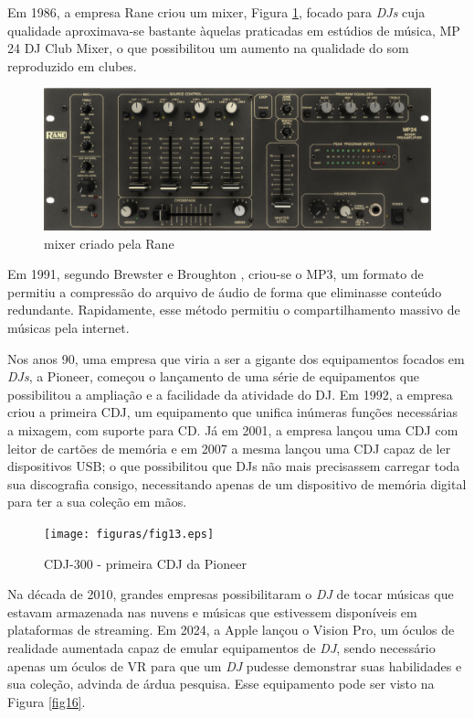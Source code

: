Em 1986, a empresa Rane criou um mixer, Figura \ref{fig15}, focado para \textit{DJs} cuja qualidade aproximava-se bastante àquelas praticadas em estúdios de música, MP 24 DJ Club Mixer, o que possibilitou um aumento na qualidade do som reproduzido em clubes.
\begin{figure}[h]
	\centering
    \includegraphics[scale=0.3]{figuras/fig15.eps}
	\caption{mixer criado pela Rane}
	\label{fig15}
\end{figure}

\par
Em 1991, segundo  Brewster e Broughton \cite{lastnight}, criou-se o MP3, um formato de permitiu a compressão do arquivo de áudio de forma que eliminasse conteúdo redundante. Rapidamente, esse método permitiu o compartilhamento massivo de músicas pela internet.


Nos anos 90, uma empresa que viria a ser a gigante dos equipamentos focados em \textit{DJs}, a Pioneer, começou o lançamento de uma série de equipamentos que possibilitou a ampliação e a facilidade da atividade do DJ. Em 1992, a empresa criou a primeira CDJ, um equipamento que unifica inúmeras funções necessárias a mixagem, com suporte para CD. Já em 2001, a empresa lançou uma CDJ com leitor de cartões de memória e em 2007 a mesma lançou uma CDJ capaz de ler dispositivos USB; o que possibilitou que DJs não mais precisassem carregar toda sua discografia consigo, necessitando apenas de um dispositivo de memória digital para ter a sua coleção em mãos.

\begin{figure}[h]
	\centering
    \texttt{[image: figuras/fig13.eps]}
	\caption{CDJ-300 - primeira CDJ da Pioneer}
	\label{fig13}
\end{figure}

\par
Na década de 2010, grandes empresas possibilitaram o \textit{DJ} de tocar músicas que estavam armazenada nas nuvens e músicas que estivessem disponíveis em plataformas de streaming. Em 2024, a Apple lançou o Vision Pro, um óculos de realidade aumentada capaz de emular equipamentos de \textit{DJ}, sendo necessário apenas um óculos de VR para que um \textit{DJ} pudesse demonstrar suas habilidades e sua coleção, advinda de árdua pesquisa. Esse equipamento pode ser visto na Figura \ref{fig16}.


